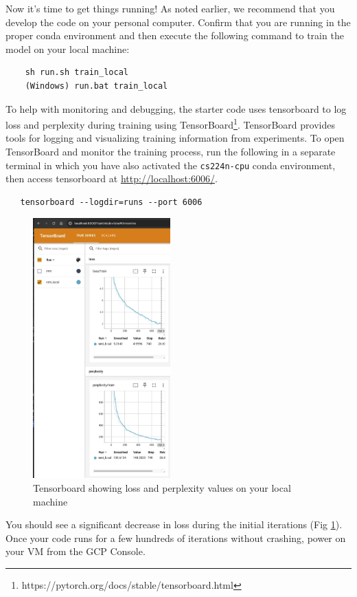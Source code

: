 Now it's time to get things running! As noted earlier, we recommend that you develop the code on your personal computer.  Confirm that you are running in the proper conda environment and then execute the following command to train the model on your local machine:
    
\begin{lstlisting}
    sh run.sh train_local
    (Windows) run.bat train_local
\end{lstlisting}

To help with monitoring and debugging, the starter code uses tensorboard to log loss and perplexity during training using TensorBoard\footnote{https://pytorch.org/docs/stable/tensorboard.html}. TensorBoard provides tools for logging and visualizing training information from experiments. To open TensorBoard and monitor the training process, run the following in a separate terminal in which you have also activated the \texttt{cs224n-cpu} conda environment, then access tensorboard at \href{http://localhost:6006/}{http://localhost:6006/}.

\begin{lstlisting}
   tensorboard --logdir=runs --port 6006
\end{lstlisting}


\begin{figure}[h]
    \centering
    \includegraphics[height=10cm]{images/tensorboard_cpu.jpg}
    \caption{Tensorboard showing loss and perplexity values on your local machine}
    \label{fig:tensorboard-cpu}
\end{figure}

You should see a significant decrease in loss during the initial iterations (Fig \ref{fig:tensorboard-cpu}). Once your code runs for a few hundreds of iterations without crashing, power on your VM from the GCP Console. 


